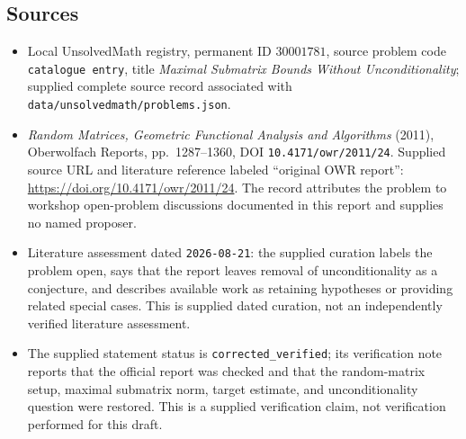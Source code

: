 \documentclass[11pt]{article}
\begin{document}
\subsection{Sources}
\begin{itemize}
\item Local UnsolvedMath registry, permanent ID \(30001781\), source problem code \texttt{catalogue entry}, title \emph{Maximal Submatrix Bounds Without Unconditionality}; supplied complete source record associated with \texttt{data/unsolvedmath/problems.json}.
\item \emph{Random Matrices, Geometric Functional Analysis and Algorithms} (2011), Oberwolfach Reports, pp.~1287--1360, DOI \texttt{10.4171/owr/2011/24}. Supplied source URL and literature reference labeled ``original OWR report'': \url{https://doi.org/10.4171/owr/2011/24}. The record attributes the problem to workshop open-problem discussions documented in this report and supplies no named proposer.
\item Literature assessment dated \texttt{2026-08-21}: the supplied curation labels the problem open, says that the report leaves removal of unconditionality as a conjecture, and describes available work as retaining hypotheses or providing related special cases. This is supplied dated curation, not an independently verified literature assessment.
\item The supplied statement status is \texttt{corrected\_verified}; its verification note reports that the official report was checked and that the random-matrix setup, maximal submatrix norm, target estimate, and unconditionality question were restored. This is a supplied verification claim, not verification performed for this draft.
\end{itemize}
\end{document}
